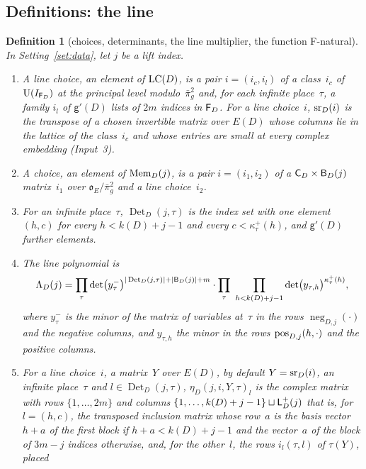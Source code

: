 \documentclass[11pt,a4paper]{article}
\newcommand{\kw}[1]{\emph{#1}}
\newcommand{\m}[1]{\mbox{$#1$}}        %
\theoremstyle{plainx}
\theoremstyle{uprightx}
\newtheorem{definition}[theorem]{Definition}
\newcommand{\OEr}{\mathfrak{o}_E}
\newcommand{\UU}{\mathrm{U}}
\newcommand{\negIx}[2]{\operatorname{neg}_{D,#1}(#2)}
\newcommand{\DetIx}[2]{\operatorname{Det}_D(#1,#2)}
\newcommand{\linePoly}[1]{\Lambda_D(#1)}
\newcommand{\detRows}[4]{\eta_{D}(#1,#2,#3,#4)}
\begin{document}
\subsection*{Definitions: the line}
\begin{definition}[choices, determinants, the line multiplier, the function F-natural]\label{d:line}
In Setting~\ref{set:data}, let $j$ be a lift index.
\begin{enumerate}[label=\textup{(\arabic*)},leftmargin=2.3em,itemsep=2pt]
\item A \kw{line choice}, an element of \m{\LineChoice{D}}, is a pair \m{i=(i_c,i_l)} of a class~$i_c$ of
\m{\UU(I_{\FlatIndex{D}})} at the principal level modulo~\m{\bar\pi_g^{2}} and, for each infinite place~$\tau$, a family
$i_l$ of \m{\mathsf{g}'(D)} lists of $2m$ indices in \m{\FlatIndex{D}}. For a line choice~$i$, \m{\shortRows{D}{i}} is
the transpose of a chosen invertible matrix over \m{E(D)} whose columns lie in the lattice of the
class~$i_c$ and whose entries are small at every complex embedding (Input~3).
\item A \kw{choice}, an element of \m{\MemberIndex{j}}, is a pair \m{i=(i_1,i_2)} of a \m{\CarrierIndex{D}\times\BigIndex{j}}
matrix~$i_1$ over \m{\OEr/\bar\pi_g^{2}} and a line choice~$i_2$.
\item For an infinite place~$\tau$, \m{\DetIx{j}{\tau}} is the index set with one element \m{(h,c)} for every
\m{h<k(D)+j-1} and every \m{c<\kappa^{+}_\tau(h)}, and \m{\mathsf{g}'(D)} further elements.
\item The \kw{line polynomial} is
\[\linePoly{j}=\prod_\tau\det\bigl(y^{-}_\tau\bigr)^{|\DetIx{j}{\tau}|+|\BigIndex{j}|+m}\cdot\prod_\tau\ \prod_{h<k(D)+j-1}\det\bigl(y_{\tau,h}\bigr)^{\kappa^{+}_\tau(h)},\]
where $y^{-}_\tau$ is the minor of the matrix of variables at~$\tau$ in the rows \m{\negIx{j}{\cdot}} and the negative
columns, and $y_{\tau,h}$ the minor in the rows \m{\posRowIndex{j}{h}{\cdot}} and the positive columns.
\item For a line choice~$i$, a matrix~$Y$ over \m{E(D)}, by default \m{Y=\shortRows{D}{i}}, an infinite
place~$\tau$ and \m{l\in\DetIx{j}{\tau}}, \m{\detRows{j}{i}{Y}{\tau}_l} is the complex matrix with rows
\m{\{1,\dots,2m\}} and columns \m{\{1,\dots,k(D)+j-1\}\sqcup\LPlusIndex{j}} that is, for \m{l=(h,c)}, the transposed
inclusion matrix whose row~$a$ is the basis vector \m{h+a} of the first block if \m{h+a<k(D)+j-1} and the vector~$a$
of the block of \m{3m-j} indices otherwise, and, for the other~$l$, the rows \m{i_l(\tau,l)} of \m{\tau(Y)}, placed

\end{enumerate}
\end{definition}
\end{document}

